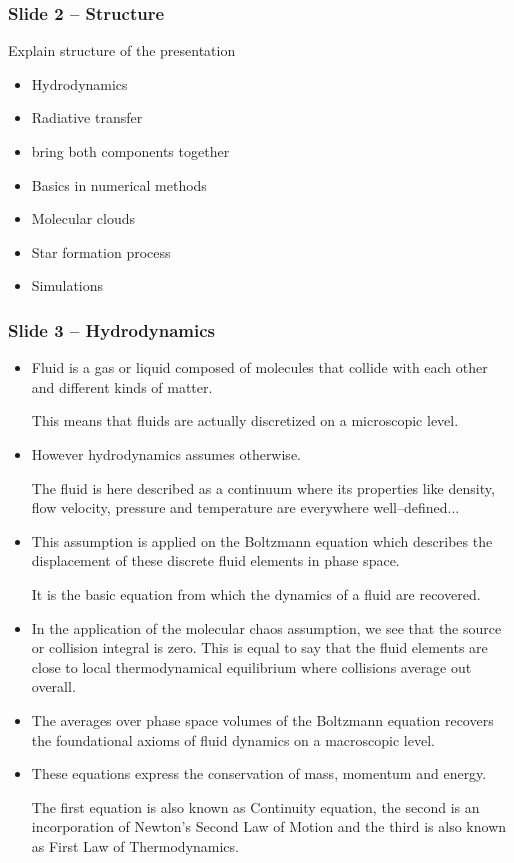 \documentclass{beamer}
\begin{document}
\begin{frame}
 \frametitle{Slide 2 -- Structure}
 Explain structure of the presentation

 \begin{itemize}
   \item Hydrodynamics
   \item Radiative transfer
   \item bring both components together
   \item Basics in numerical methods
   \item Molecular clouds
   \item Star formation process
   \item Simulations
 \end{itemize}
\end{frame}
\begin{frame}
  \frametitle{Slide 3 -- Hydrodynamics}
 \begin{itemize}
   \item Fluid is a gas or liquid composed of molecules that collide with each other and different kinds of matter.

   This means that fluids are actually discretized on a microscopic level.

   \item However hydrodynamics assumes otherwise.

   The fluid is here described as a continuum where its properties like density, flow velocity, pressure and temperature are everywhere well--defined...
 \end{itemize}
\end{frame}
\begin{frame}
 \begin{itemize}
   \item This assumption is applied on the Boltzmann equation which describes the displacement of these discrete fluid elements in phase space.

   It is the basic equation from which the dynamics of a fluid are recovered.

   \item In the application of the molecular chaos assumption, we see that the source or collision integral is zero.
   This is equal to say that the fluid elements are close to local thermodynamical equilibrium where collisions average out overall.

   \item The averages over phase space volumes of the Boltzmann equation recovers the foundational axioms of fluid dynamics on a macroscopic level.

   \item These equations express the conservation of mass, momentum and energy.

   The first equation is also known as Continuity equation, the second is an incorporation of Newton's Second Law of Motion and the third is also known as First Law of Thermodynamics.
 \end{itemize}
\end{frame}
\end{document}
